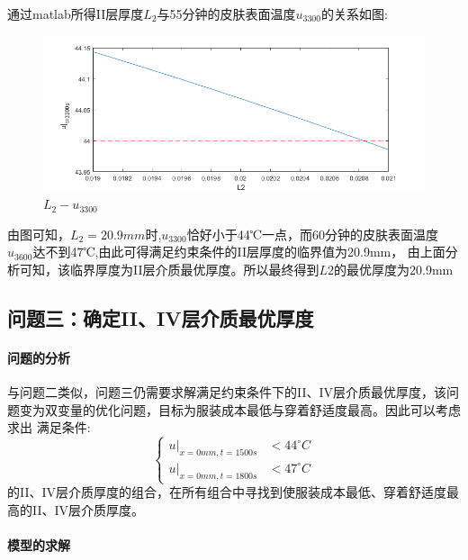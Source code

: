 \documentclass{cumcmthesis}
\begin{document}
            通过matlab所得II层厚度\(L_2\)与55分钟的皮肤表面温度\(u_{3300}\)的关系如图:

            \begin{figure}[ht] 
                \centering 
                \includegraphics[scale=0.7]{../figure/ques2result.png} 
                \caption{\(L_2 - u_{3300}\)}\label{fig:one}    
            \end{figure}

            由图可知，\(L_2 = 20.9mm\)时,\(u_{3300}\)恰好小于44℃一点，而60分钟的皮肤表面温度\(u_{3600}\)达不到47℃,由此可得满足约束条件的II层厚度的临界值为20.9mm，
            由上面分析可知，该临界厚度为II层介质最优厚度。所以最终得到\(L2\)的最优厚度为20.9mm


     \subsection{问题三：确定II、IV层介质最优厚度} 
        \paragraph{问题的分析}
            与问题二类似，问题三仍需要求解满足约束条件下的II、IV层介质最优厚度，该问题变为双变量的优化问题，目标为服装成本最低与穿着舒适度最高。因此可以考虑求出
            满足条件:
            \[
                \left\{
                    \begin{aligned}
                        u|_{x=0mm,t=1500s}&<44^{\circ}C\\
                        u|_{x=0mm,t=1800s}&<47^{\circ}C
                    \end{aligned}
                \right.     
            \]
            的II、IV层介质厚度的组合，在所有组合中寻找到使服装成本最低、穿着舒适度最高的II、IV层介质厚度。
        \paragraph{模型的求解} 
\end{document}
